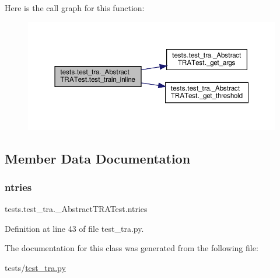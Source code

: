 Here is the call graph for this function\+:
\nopagebreak
\begin{figure}[H]
\begin{center}
\leavevmode
\includegraphics[width=350pt]{classtests_1_1test__tra_1_1__AbstractTRATest_a8f1fa4ff06f7fd52c1639655561fe7ee_cgraph}
\end{center}
\end{figure}


\subsection{Member Data Documentation}
\mbox{\label{classtests_1_1test__tra_1_1__AbstractTRATest_ad32ac0cefbe9f77b0b1541085cf5365a}} 
\subsubsection{\texorpdfstring{ntries}{ntries}}
{\footnotesize\ttfamily tests.\+test\+\_\+tra.\+\_\+\+Abstract\+T\+R\+A\+Test.\+ntries\hspace{0.3cm}{\ttfamily [static]}}



Definition at line 43 of file test\+\_\+tra.\+py.



The documentation for this class was generated from the following file\+:\begin{DoxyCompactItemize}
\item 
tests/\hyperlink{test__tra_8py}{test\+\_\+tra.\+py}\end{DoxyCompactItemize}
